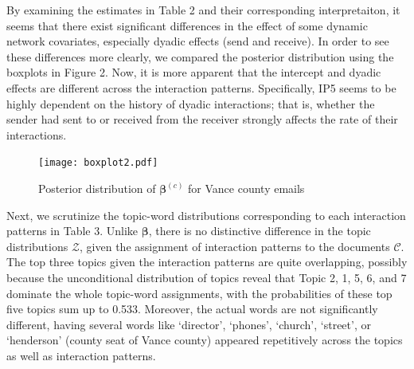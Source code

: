 \documentclass[a4paper]{article}
\begin{document}
By examining the estimates in Table 2 and their corresponding interpretaiton, it seems that there exist significant differences in the effect of some dynamic network covariates, especially dyadic effects (send and receive). In order to see these differences more clearly, we compared the posterior distribution using the boxplots in Figure 2. Now, it is more apparent that the intercept and dyadic effects are different across the interaction patterns. Specifically, IP5 seems to be highly dependent on the history of dyadic interactions; that is, whether the sender had sent to or received from the receiver strongly affects the rate of their interactions.
\begin{figure}[ht]
	\centering
	\texttt{[image: boxplot2.pdf]} 
	\caption{Posterior distribution of  $\boldsymbol{\beta}^{(c)}$ for Vance county emails}
	\label{fig:Vanceboxplot}
\end{figure}
\newline Next, we scrutinize the topic-word distributions corresponding to each interaction patterns in Table 3. Unlike $\boldsymbol{\beta}$, there is no distinctive difference in the topic distributions $\mathcal{Z}$, given the assignment of interaction patterns to the documents $\mathcal{C}$. The top three topics given the interaction patterns are quite overlapping, possibly because the unconditional distribution of topics reveal that Topic 2, 1, 5, 6, and 7 dominate the whole topic-word assignments, with the probabilities of these top five topics sum up to 0.533. Moreover, the actual words are not significantly different, having several words like `director', `phones', `church', `street', or `henderson' (county seat of Vance county) appeared repetitively across the topics as well as interaction patterns.
\footnotesize

\end{document}
